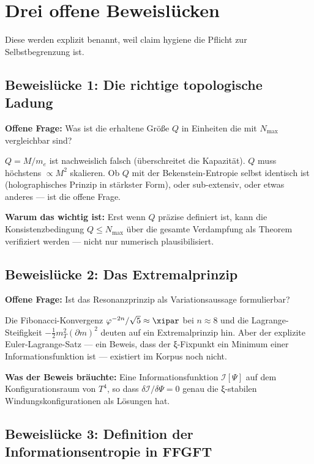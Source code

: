 \section{Drei offene Beweislücken}

Diese werden explizit benannt, weil claim hygiene die Pflicht zur Selbstbegrenzung ist.

\subsection{Beweislücke 1: Die richtige topologische Ladung}

\textbf{Offene Frage:} Was ist die erhaltene Größe $Q$ in Einheiten die mit $N_\text{max}$ vergleichbar sind?

$Q = M/m_e$ ist nachweislich falsch (überschreitet die Kapazität). $Q$ muss höchstens $\propto M^2$ skalieren. Ob $Q$ mit der Bekenstein-Entropie selbst identisch ist (holographisches Prinzip in stärkster Form), oder sub-extensiv, oder etwas anderes --- ist die offene Frage.

\textbf{Warum das wichtig ist:} Erst wenn $Q$ präzise definiert ist, kann die Konsistenzbedingung $Q \leq N_\text{max}$ über die gesamte Verdampfung als Theorem verifiziert werden --- nicht nur numerisch plausibilisiert.

\subsection{Beweislücke 2: Das Extremalprinzip}

\textbf{Offene Frage:} Ist das Resonanzprinzip als Variationsaussage formulierbar?

Die Fibonacci-Konvergenz $\varphi^{-2n}/\sqrt{5} \approx \xipar$ bei $n \approx 8$ und die Lagrange-Steifigkeit $-\frac{1}{2}m_T^2(\partial m)^2$ deuten auf ein Extremalprinzip hin. Aber der explizite Euler-Lagrange-Satz --- ein Beweis, dass der ξ-Fixpunkt ein Minimum einer Informationsfunktion ist --- existiert im Korpus noch nicht.

\textbf{Was der Beweis bräuchte:} Eine Informationsfunktion $\mathcal{I}[\Psi]$ auf dem Konfigurationsraum von $T^4$, so dass $\delta\mathcal{I}/\delta\Psi = 0$ genau die ξ-stabilen Windungskonfigurationen als Lösungen hat.

\subsection{Beweislücke 3: Definition der Informationsentropie in FFGFT}

